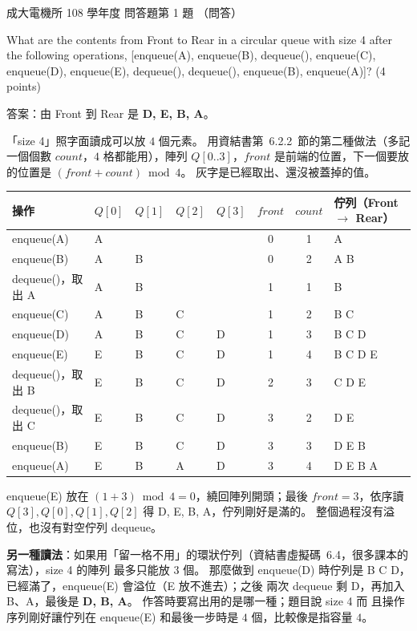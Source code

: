 \begin{pastexam}[label={px:ncku-108-ee-ds-02}]{成大電機所 108 學年度 問答題第 1 題}
（問答）

What are the contents from Front to Rear in a circular queue with size 4 after the following
operations, [enqueue(A), enqueue(B), dequeue(), enqueue(C), enqueue(D), enqueue(E), dequeue(),
dequeue(), enqueue(B), enqueue(A)]? (4 points)
\end{pastexam}

\begin{pastsoln}
答案：由 Front 到 Rear 是 \textbf{D, E, B, A}。

「size 4」照字面讀成可以放 $4$ 個元素。 用資結書第~6.2.2~節的第二種做法（多記一個個數
$\mathit{count}$，$4$ 格都能用），陣列 $Q[0..3]$，$\mathit{front}$ 是前端的位置，下一個要放的位置是
$(\mathit{front} + \mathit{count}) \bmod 4$。 灰字是已經取出、還沒被蓋掉的值。

\begin{center}
\small
\begin{tabular}{lllllccl}
\toprule
操作 & $Q[0]$ & $Q[1]$ & $Q[2]$ & $Q[3]$ & $\mathit{front}$ & $\mathit{count}$ & 佇列（Front $\to$ Rear） \\
\midrule
enqueue(A) & A & & & & 0 & 1 & A \\
enqueue(B) & A & B & & & 0 & 2 & A B \\
dequeue()，取出 A & \textcolor{black!40}{A} & B & & & 1 & 1 & B \\
enqueue(C) & \textcolor{black!40}{A} & B & C & & 1 & 2 & B C \\
enqueue(D) & \textcolor{black!40}{A} & B & C & D & 1 & 3 & B C D \\
enqueue(E) & E & B & C & D & 1 & 4 & B C D E \\
dequeue()，取出 B & E & \textcolor{black!40}{B} & C & D & 2 & 3 & C D E \\
dequeue()，取出 C & E & \textcolor{black!40}{B} & \textcolor{black!40}{C} & D & 3 & 2 & D E \\
enqueue(B) & E & B & \textcolor{black!40}{C} & D & 3 & 3 & D E B \\
enqueue(A) & E & B & A & D & 3 & 4 & D E B A \\
\bottomrule
\end{tabular}
\end{center}
enqueue(E) 放在 $(1 + 3) \bmod 4 = 0$，繞回陣列開頭；最後 $\mathit{front} = 3$，依序讀 $Q[3], Q[0], Q[1], Q[2]$
得 D, E, B, A，佇列剛好是滿的。 整個過程沒有溢位，也沒有對空佇列 dequeue。

\textbf{另一種讀法}：如果用「留一格不用」的環狀佇列（資結書虛擬碼~6.4，很多課本的寫法），size 4 的陣列
最多只能放 $3$ 個。 那麼做到 enqueue(D) 時佇列是 B C D，已經滿了，enqueue(E) 會溢位（E 放不進去）；之後
兩次 dequeue 剩 D，再加入 B、A，最後是 \textbf{D, B, A}。 作答時要寫出用的是哪一種；題目說 size 4 而
且操作序列剛好讓佇列在 enqueue(E) 和最後一步時是 $4$ 個，比較像是指容量 $4$。
\end{pastsoln}
